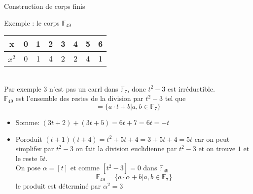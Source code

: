 \begin{parag}{Construction de corps finis}
\begin{subparag}{Exemple : le corps $\mathbb{F}_{49}$}
            \begin{tabular}{c||c|c|c|c|c|c|c|}
                x &0 & 1 & 2 & 3 & 4 & 5 & 6 \\
                \hline
                 $x^2$& 0 & 1 & 4 & 2 & 2 & 4 & 1 
            \end{tabular}
            \\
            Par exemple $3$ n'est pas un carrl dans $\mathbb{F}_7$, donc $t^2-3$ est irréductible.
            \\
            $\mathbb{F}_{49}$ est l'ensemble des restes de la division par $t^2 - 3$ tel que
            \[ = \{a\cdot t + b | a, b \in \mathbb{F}_7\}\]
            \begin{itemize}
                \item Somme: $(3t + 2) + (3t + 5) = 6t + 7 = 6t = -t$
                \item Poroduit $(t+1)(t+4) = t^2 + 5t + 4 = 3 + 5t + 4 = 5t$ car on peut simplifer par $t^2 - 3$ on fait la division euclidienne par $t^2 - 3$ et on trouve $1$ et le reste $5t$.
                \\
                On pose $\alpha = [t]$ et comme $[t^2 - 3] = 0$ dans $\mathbb{F}_{49}$
                \[\mathbb{F}_{49} = \{a \cdot \alpha + b | a, b \in \mathbb{F}_7\}\]
                le produit est déterminé par $\alpha^2 = 3$
            \end{itemize}
    \end{subparag}
\end{parag}